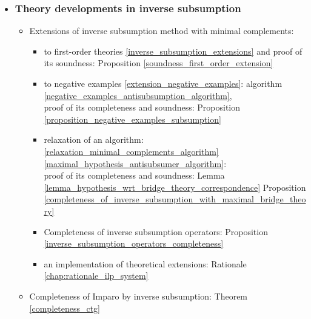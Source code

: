 \begin{itemize}
\item \subsubsection{Theory developments in inverse subsumption}
\begin{itemize}
\item Extensions of inverse subsumption method with minimal complements:
\begin{itemize}
\item to first-order theories \ref{inverse_subsumption_extensions} and proof of its soundness: Proposition \ref{soundness_first_order_extension}
\item to negative examples \ref{extension_negative_examples}: algorithm \ref{negative_examples_antisubsumption_algorithm},\\proof of its completeness and soundness: Proposition \ref{proposition_negative_examples_subsumption}
\item relaxation of an algorithm: \ref{relaxation_minimal_complements_algorithm} \ref{maximal_hypothesis_antisubsumer_algorithm}:\\proof of its completeness and soundness: Lemma \ref{lemma_hypothesis_wrt_bridge_theory_correspondence} Proposition \ref{completeness_of_inverse_subsumption_with_maximal_bridge_theory}
\item Completeness of inverse subsumption operators: Proposition \ref{inverse_subsumption_operators_completeness}
\item an implementation of theoretical extensions: Rationale \ref{chap:rationale_ilp_system}
\end{itemize}

\item Completeness of Imparo by inverse subsumption: Theorem \ref{completeness_ctg}
\end{itemize}

\end{itemize}

